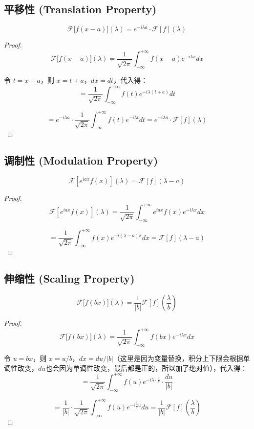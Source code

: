 \documentclass[12pt,a4paper]{article}
\theoremstyle{plain}
\theoremstyle{definition}
\theoremstyle{remark}
\begin{document}
	\subsection{平移性 (Translation Property)}
	\[
	\mathcal{F}\big[f(x-a)\big](\lambda) = e^{-i\lambda a} \cdot \mathcal{F}[f](\lambda)
	\]
	\begin{proof}
		
		\[
		\mathcal{F}\big[f(x-a)\big](\lambda) = \frac{1}{\sqrt{2\pi}} \int_{-\infty}^{+\infty} f(x-a) e^{-i\lambda x} dx
		\]
		
		令 $t = x - a$，则 $x = t + a$，$dx = dt$，代入得：
		\[
		= \frac{1}{\sqrt{2\pi}} \int_{-\infty}^{+\infty} f(t) e^{-i\lambda (t+a)} dt
		\]
		
		\[
		= e^{-i\lambda a} \cdot \frac{1}{\sqrt{2\pi}} \int_{-\infty}^{+\infty} f(t) e^{-i\lambda t} dt = e^{-i\lambda a} \cdot \mathcal{F}[f](\lambda)
		\]
	\end{proof}
	
	\subsection{调制性 (Modulation Property)}
	
	\[
	\mathcal{F}\left[e^{iax}f(x)\right](\lambda) = \mathcal{F}[f](\lambda - a)
	\]
	\begin{proof}
		
		\[
		\mathcal{F}\left[e^{iax}f(x)\right](\lambda) = \frac{1}{\sqrt{2\pi}} \int_{-\infty}^{+\infty} e^{iax}f(x) e^{-i\lambda x} dx
		\]
		
		\[
		= \frac{1}{\sqrt{2\pi}} \int_{-\infty}^{+\infty} f(x) e^{-i(\lambda - a)x} dx = \mathcal{F}[f](\lambda - a)
		\]
	\end{proof}
	
	\subsection{伸缩性 (Scaling Property)}
	
	\[
	\mathcal{F}\big[f(bx)\big](\lambda) = \frac{1}{|b|} \mathcal{F}[f]\left( \frac{\lambda}{b} \right)
	\]
	\begin{proof}
		
		\[
		\mathcal{F}\big[f(bx)\big](\lambda) = \frac{1}{\sqrt{2\pi}} \int_{-\infty}^{+\infty} f(bx) e^{-i\lambda x} dx
		\]
		
		令 $u = bx$，则 $x = u/b$，$dx = du/|b|$（这里是因为变量替换，积分上下限会根据单调性改变，$du$也会因为单调性改变，最后都是正的，所以加了绝对值），代入得：
		\[
		= \frac{1}{\sqrt{2\pi}} \int_{-\infty}^{+\infty} f(u) e^{-i\lambda \cdot \frac{u}{b}} \cdot \frac{du}{|b|}
		\]
		
		\[
		= \frac{1}{|b|} \cdot \frac{1}{\sqrt{2\pi}} \int_{-\infty}^{+\infty} f(u) e^{-i\frac{\lambda}{b}u} du = \frac{1}{|b|} \mathcal{F}[f]\left( \frac{\lambda}{b} \right)
		\]
	\end{proof}
	
\end{document}
